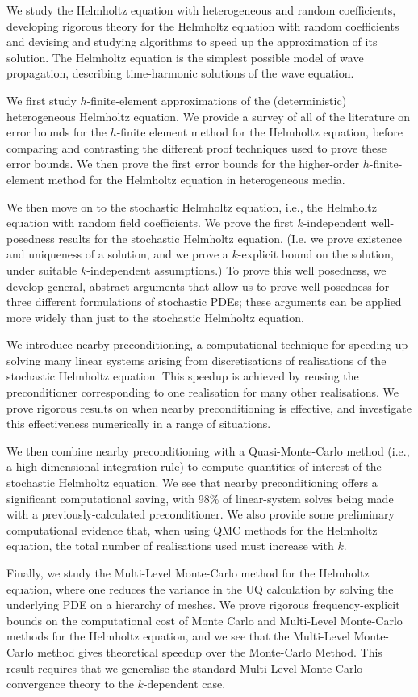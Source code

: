 We study the Helmholtz equation with heterogeneous and random coefficients, developing rigorous theory for the Helmholtz equation with random coefficients and devising and studying algorithms to speed up the approximation of its solution. The Helmholtz equation is the simplest possible model of wave propagation, describing time-harmonic solutions of the wave equation.

We first study $h$-finite-element approximations of the (deterministic) heterogeneous Helmholtz equation. We provide a survey of all of the literature on error bounds for the $h$-finite element method for the Helmholtz equation, before comparing and contrasting the different proof techniques used to prove these error bounds. We then prove the first error bounds for the higher-order $h$-finite-element method for the Helmholtz equation in heterogeneous media.

We then move on to the stochastic Helmholtz equation, i.e., the Helmholtz equation with random field coefficients. We prove the first $k$-independent well-posedness results for the stochastic Helmholtz equation. (I.e. we prove existence and uniqueness of a solution, and we prove a $k$-explicit bound on the solution, under suitable $k$-independent assumptions.) To prove this well posedness, we develop general, abstract arguments that allow us to prove well-posedness for three different formulations of stochastic PDEs; these arguments can be applied more widely than just to the stochastic Helmholtz equation.

We introduce nearby preconditioning, a computational technique for speeding up solving many linear systems arising from discretisations of realisations of the stochastic Helmholtz equation. This speedup is achieved by reusing the preconditioner corresponding to one realisation for many other realisations. We prove rigorous results on when nearby preconditioning is effective, and investigate this effectiveness numerically in a range of situations.

We then combine nearby preconditioning with a Quasi-Monte-Carlo method (i.e., a high-dimensional integration rule) to compute quantities of interest of the stochastic Helmholtz equation. We see that nearby preconditioning offers a significant computational saving, with 98\% of linear-system solves being made with a previously-calculated preconditioner. We also provide some preliminary computational evidence that, when using QMC methods for the Helmholtz equation, the total number of realisations used must increase with $k.$

Finally, we study the Multi-Level Monte-Carlo method for the Helmholtz equation, where one reduces the variance in the UQ calculation  by solving the underlying PDE on a hierarchy of meshes. We prove rigorous frequency-explicit bounds on the computational cost of Monte Carlo and Multi-Level Monte-Carlo methods for the Helmholtz equation, and we see that the Multi-Level Monte-Carlo method gives theoretical speedup over the Monte-Carlo Method. This result requires that we generalise the standard Multi-Level Monte-Carlo convergence theory to the $k$-dependent case.
